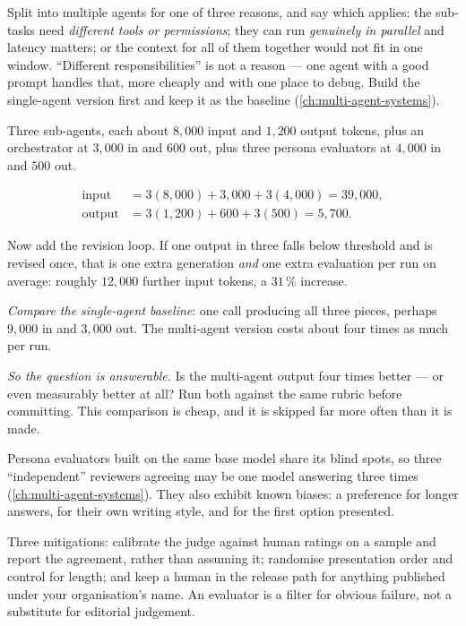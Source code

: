 \begin{engineernote}
Split into multiple agents for one of three reasons, and say which applies:
the sub-tasks need \emph{different tools or permissions}; they can run
\emph{genuinely in parallel} and latency matters; or the context for all of
them together would not fit in one window. ``Different responsibilities'' is
not a reason --- one agent with a good prompt handles that, more cheaply and
with one place to debug. Build the single-agent version first and keep it as
the baseline (\cref{ch:multi-agent-systems}).
\end{engineernote}

\begin{workedexample}
Three sub-agents, each about $8{,}000$ input and $1{,}200$ output tokens, plus
an orchestrator at $3{,}000$ in and $600$ out, plus three persona evaluators at
$4{,}000$ in and $500$ out.

\[
\begin{aligned}
  \text{input} &= 3(8{,}000) + 3{,}000 + 3(4{,}000) = 39{,}000,\\
  \text{output} &= 3(1{,}200) + 600 + 3(500) = 5{,}700 .
\end{aligned}
\]

Now add the revision loop. If one output in three falls below threshold and is
revised once, that is one extra generation \emph{and} one extra evaluation per
run on average: roughly $12{,}000$ further input tokens, a $31\,\%$ increase.

\emph{Compare the single-agent baseline}: one call producing all three pieces,
perhaps $9{,}000$ in and $3{,}000$ out. The multi-agent version costs about
four times as much per run.

\emph{So the question is answerable.} Is the multi-agent output four times
better --- or even measurably better at all? Run both against the same rubric
before committing. This comparison is cheap, and it is skipped far more often
than it is made.
\end{workedexample}

\begin{cautionbox}
Persona evaluators built on the same base model share its blind spots, so
three ``independent'' reviewers agreeing may be one model answering three
times (\cref{ch:multi-agent-systems}). They also exhibit known biases: a
preference for longer answers, for their own writing style, and for the first
option presented.

Three mitigations: calibrate the judge against human ratings on a sample and
report the agreement, rather than assuming it; randomise presentation order
and control for length; and keep a human in the release path for anything
published under your organisation's name. An evaluator is a filter for obvious
failure, not a substitute for editorial judgement.
\end{cautionbox}

